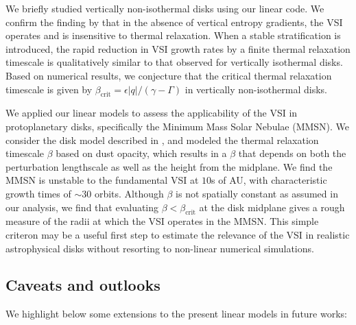 
We briefly studied vertically non-isothermal disks using our linear 
code. We confirm the finding by \cite{nelson13} that in the absence
of vertical entropy gradients, the VSI operates and is insensitive to
thermal relaxation. When a stable stratification is introduced, the
rapid reduction in VSI growth rates by a finite thermal relaxation
timescale is qualitatively similar to that observed for vertically
isothermal disks. Based on numerical results, we conjecture that the
critical thermal relaxation timescale is given by 
$\beta_\mathrm{crit}=\epsilon|q|/(\gamma-\Gamma)$ in vertically 
non-isothermal disks.  


We applied our linear models to assess the applicability of the VSI in
protoplanetary disks, specifically the Minimum Mass Solar Nebulae
(MMSN). We consider the disk model described in \cite{chiang10}, and
modeled the thermal relaxation timescale $\beta$ based on
dust opacity, which results in a $\beta$ that depends on both the
perturbation lengthscale as well as the height from the midplane.  
We find the MMSN is unstable to the fundamental VSI at $10$s of AU,
with characteristic growth times of $\sim 30$ orbits. Although $\beta$
is not spatially constant as assumed in our analysis, we find that
evaluating $\beta < \beta_\mathrm{crit}$ at the disk
midplane gives a rough measure of the radii at which the VSI operates in the
MMSN.  This simple criteron may be a useful first step to 
estimate the relevance of the VSI in realistic astrophysical
disks without resorting to non-linear numerical simulations. 



\subsection{Caveats and outlooks} 
We highlight below some extensions to the present  
linear models in future works:  

